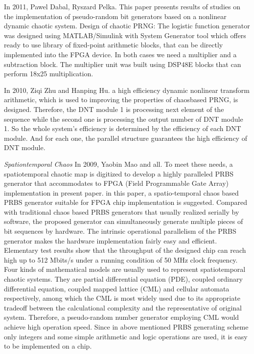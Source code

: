 In 2011, Pawel Dabal, Ryszard Pelka. This paper presents results of studies on the implementation of pseudo-random bit generators based on a nonlinear dynamic chaotic system. Design of chaotic PRNG: The logistic function generator was designed using MATLAB/Simulink with System Generator tool which offers ready to use library of fixed-point arithmetic blocks, that can be directly implemented into the FPGA device. In both cases we need a multiplier and a subtraction block. The multiplier unit was built using DSP48E blocks that can perform 18x25 multiplication.

In 2010, Ziqi Zhu and Hanping Hu. a high efficiency dynamic nonlinear transform arithmetic, which is used to improving the properties of chaosbased PRNG, is designed. Therefore, the DNT module 1 is processing next element of the sequence while the second one is processing the output number of DNT module 1. So the whole system's efficiency is determined by the efficiency of each DNT module. And for each one, the parallel structure guarantees the high efficiency of DNT module.


\textit{Spationtemporal Chaos} In 2009, Yaobin Mao and all. To meet these needs, a spatiotemporal chaotic map is digitized to develop a highly paralleled PRBS generator that accommodates to FPGA (Field Programmable Gate Array) implementation in present paper. in this paper, a spatio-temporal chaos based PRBS generator suitable for FPGA chip implementation is suggested. Compared with traditional chaos based PRBS generators that usually realized serially by software, the proposed generator can simultaneously generate multiple pieces of bit sequences by hardware. The intrinsic operational parallelism of the PRBS generator makes the hardware implementation fairly easy and efficient. Elementary test results show that the throughput of the designed chip can reach high up to 512 Mbits/s under a running condition of 50 MHz clock frequency. Four kinds of mathematical models are usually used to represent spatiotemporal chaotic systems. They are partial differential equation (PDE), coupled ordinary differential equation, coupled mapped lattice (CML) and cellular automata respectively, among which the CML is most widely used due to its appropriate tradeoff between the calculational complexity and the representative of original system. Therefore, a pseudo-random number generator employing CML would achieve high operation speed. Since in above mentioned PRBS generating scheme only integers and some simple arithmetic and logic operations are used, it is easy to be implemented on a chip. 

